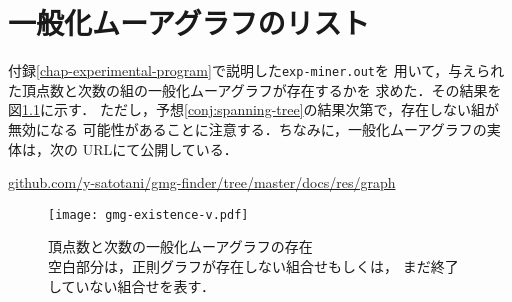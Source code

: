 
\chapter{一般化ムーアグラフのリスト}
\label{chap:list-of-gmg}
付録\ref{chap-experimental-program}で説明した\verb|exp-miner.out|を
用いて，与えられた頂点数と次数の組の一般化ムーアグラフが存在するかを
求めた．その結果を図\ref{fig:gmg-existence}に示す．
ただし，予想\ref{conj:spanning-tree}の結果次第で，存在しない組が無効になる
可能性があることに注意する．ちなみに，一般化ムーアグラフの実体は，次の
URLにて公開している．

\url{github.com/y-satotani/gmg-finder/tree/master/docs/res/graph}

\begin{figure}[htbp]
  \centering
  \captionsetup{justification=centering}
  \texttt{[image: gmg-existence-v.pdf]}
  \caption{頂点数と次数の一般化ムーアグラフの存在\\
    空白部分は，正則グラフが存在しない組合せもしくは，
    まだ終了していない組合せを表す．}
  \label{fig:gmg-existence}
\end{figure}

